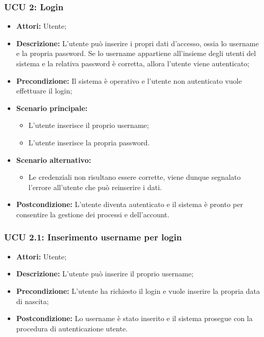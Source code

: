 \subsubsection{UCU 2: Login}
\begin{itemize}
\item \textbf{Attori:} Utente;
\item \textbf{Descrizione:} L'utente può inserire i propri dati d'accesso, ossia lo username e la propria password. Se lo username appartiene all'insieme degli utenti del sistema e la relativa password è corretta, allora l'utente viene autenticato;
\item \textbf{Precondizione:} Il sistema è operativo e l'utente non autenticato vuole effettuare il login;
\item \textbf{Scenario principale:}
\begin{itemize}
\item L'utente inserisce il proprio username;
\item L'utente inserisce la propria password.
\end{itemize}
\item \textbf{Scenario alternativo:}
\begin{itemize}
\item Le credenziali non risultano essere corrette, viene dunque segnalato l'errore all'utente che può reinserire i dati.
\end{itemize}
\item \textbf{Postcondizione:} L'utente diventa autenticato e il sistema è pronto per consentire la gestione dei processi e dell'account.
\end{itemize}

\hypertarget{U2.1}{}
\subsubsection{UCU 2.1: Inserimento username per login}
\begin{itemize}
\item \textbf{Attori:} Utente;
\item \textbf{Descrizione:} L'utente può inserire il proprio username;
\item \textbf{Precondizione:} L'utente ha richiesto il login e vuole inserire la propria data di nascita;
\item \textbf{Postcondizione:} Lo username è stato inserito e il sistema prosegue con la procedura di autenticazione utente.
\end{itemize}

